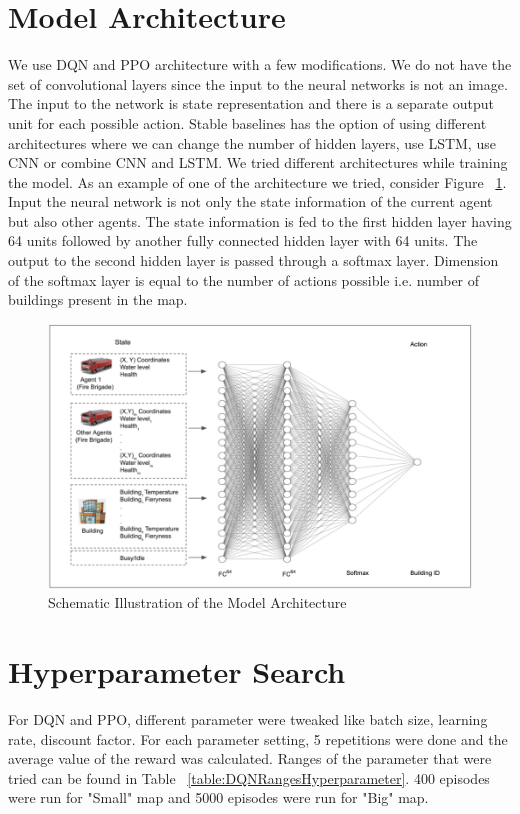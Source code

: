 \documentclass[12pt]{report}
\begin{document}
\section{Model Architecture}

We use DQN and PPO architecture with a few modifications. We do not have the set of convolutional layers since the input to the neural networks is not an image. The input to the network is state representation and there is a separate output unit for each possible action. Stable baselines has the option of using different architectures where we can change the number of hidden layers, use LSTM, use CNN or combine CNN and LSTM. We tried different architectures while training the model. As an example of one of the architecture we tried, consider Figure ~\ref{fig:27}. Input the neural network is not only the state information of the current agent but also other agents. The state information is fed to the first hidden layer having 64 units followed by another fully connected hidden layer with 64 units. The output to the second hidden layer is passed through a softmax layer. Dimension of the softmax layer is equal to the number of actions possible i.e. number of buildings present in the map. 

\begin{figure}[!h]
    \centering
    \includegraphics[width=17cm]{27}
    \caption{Schematic Illustration of the Model Architecture}
    \label{fig:27}
\end{figure}

\section{Hyperparameter Search}

For DQN and PPO, different parameter were tweaked like batch size, learning rate, discount factor. For each parameter setting, 5 repetitions were done and the average value of the reward was calculated. Ranges of the parameter that were tried can be found in Table ~\ref{table:DQNRangesHyperparameter}. 400 episodes were run for "Small" map and 5000 episodes were run for "Big" map. 
\end{document}
